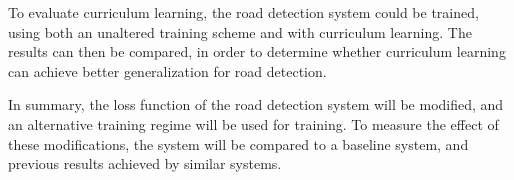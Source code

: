To evaluate curriculum learning, the road detection system could be trained, using both an unaltered training scheme and with curriculum learning. The results can then be compared, in order to determine whether curriculum learning can achieve better generalization for road detection.\\


In summary, the loss function of the road detection system will be modified, and an alternative training regime will be used for training. To measure the effect of these modifications, the system will be compared to a baseline system, and previous results achieved by similar systems.